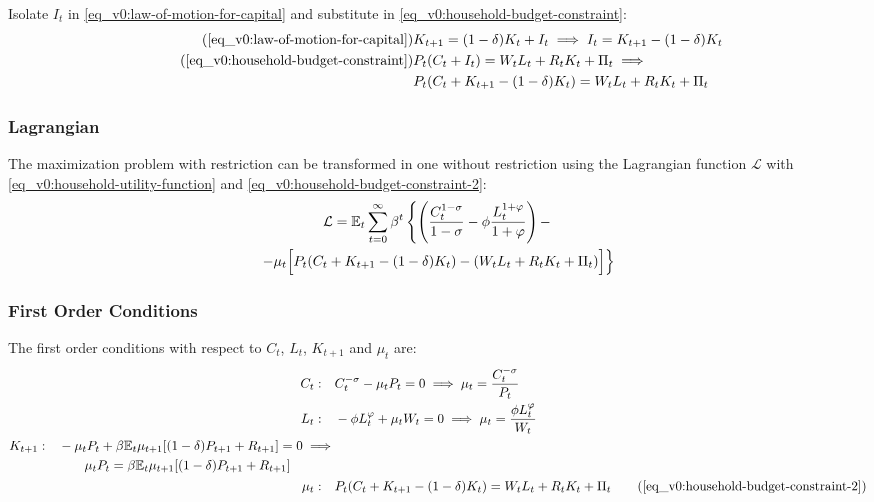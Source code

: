 \documentclass[../thesis.tex]{subfiles}
\begin{document}
	Isolate $I_t$ in \ref{eq_v0:law-of-motion-for-capital} and substitute in \ref{eq_v0:household-budget-constraint}:
	\begin{align}
		\tag{\ref{eq_v0:law-of-motion-for-capital}}
		& K_{t+1} = (1-\delta)K_t + I_t \implies I_t = K_{t+1} - (1-\delta)K_t \\
		\tag{\ref{eq_v0:household-budget-constraint}}
		& P_t (C_t + I_t) = W_t L_t + R_t K_t + \Pi_t \implies \\
		\label{eq_v0:household-budget-constraint-2}
		& P_t (C_t + K_{t+1} - (1-\delta)K_t) = W_t L_t + R_t K_t + \Pi_t
	\end{align}
	
	\subsubsection*{Lagrangian}
	
	The maximization problem with restriction can be transformed in one without restriction using the Lagrangian function $\mathcal{L}$ with \ref{eq_v0:household-utility-function} and \ref{eq_v0:household-budget-constraint-2}:
	\begin{multline}
		\label{eq_v0:household-lagrangian}
		\mathcal{L} = \mathbb{E}_t \sum_{t=0}^{\infty} \beta^t 
		\left\{ \left( \frac{C_t^{1-\sigma}}{1-\sigma} - \phi \frac{L_t^{1+\varphi}}{1+\varphi} \right) - \right.
		\\
		\left. -\mu_t \Bigr[ P_t (C_t + K_{t+1} - (1-\delta) K_t) - (W_t L_t + R_t K_t + \Pi_t) \Bigl] \right\}
	\end{multline}
	
	\subsubsection*{First Order Conditions}
	
	The first order conditions with respect to $C_t$, $L_t$, $K_{t+1}$ and $\mu_t$ are:
	\begin{align}
		C_t: \quad & C_t^{-\sigma} -\mu_t P_t = 0 \implies \mu_t = \frac{C_t^{-\sigma}}{P_t} \label{eq_v0:household-FOC-Ct} \\
		L_t: \quad & -\phi L_t^{\varphi} +\mu_t W_t = 0 \implies \mu_t = \frac{\phi L_t^{\varphi}}{W_t} \label{eq_v0:household-FOC-Lt} \\
		\begin{split}
			K_{t+1}: \quad & -\mu_t P_t +\beta \mathbb{E}_t \mu_{t+1} [(1-\delta) P_{t+1} + R_{t+1}] = 0 \implies \\ & \qquad \mu_t P_t = \beta \mathbb{E}_t \mu_{t+1} [(1-\delta) P_{t+1} + R_{t+1}]
		\end{split} \label{eq_v0:household-FOC-Kt} \\
		\mu_t: \quad & P_t (C_t + K_{t+1} - (1-\delta)K_t) = W_t L_t + R_t K_t + \Pi_t \tag{\ref{eq_v0:household-budget-constraint-2}}
	\end{align}
	
\end{document}
